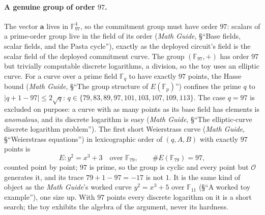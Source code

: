 \documentclass[11pt,a4paper]{article}
\theoremstyle{definition}
\newcommand{\F}{\mathbb{F}}
\begin{document}
\paragraph{A genuine group of order $97$.}
The vector $\mathbf a$ lives in $\F_{97}^{4}$, so the commitment group
must have order $97$: scalars of a prime-order group live in the field
of its order (\emph{Math Guide}, \S``Base fields, scalar fields, and
the Pasta cycle''), exactly as the deployed circuit's field is the
scalar field of the deployed commitment curve. The group
$(\F_{97}, +)$ has order $97$ but trivially computable discrete
logarithms, a division, so the toy uses an elliptic curve. For a curve
over a prime field $\F_q$ to have exactly $97$ points, the Hasse bound
(\emph{Math Guide}, \S``The group structure of $E(\F_p)$'') confines the
prime $q$ to $|q + 1 - 97| \le 2\sqrt q$:
$q \in \{79, 83, 89, 97, 101, 103, 107, 109, 113\}$. The case $q = 97$
is excluded on purpose: a curve with as many points as its base field
has elements is \emph{anomalous}, and its discrete logarithm is easy
(\emph{Math Guide}, \S``The elliptic-curve discrete logarithm
problem''). The first short Weierstrass curve (\emph{Math Guide},
\S``Weierstrass equations'') in lexicographic order of $(q, A, B)$ with
exactly $97$ points is
\[
E \colon y^{2} = x^{3} + 3 \quad\text{over } \F_{79},
\qquad \#E(\F_{79}) = 97 ,
\]
counted point by point; $97$ is prime, so the group is cyclic and every
point but $\mathcal O$ generates it, and its trace $79 + 1 - 97 = -17$
is not $1$. It is the same kind of object as the \emph{Math Guide}'s
worked curve $y^2 = x^3 + 5$ over $\F_{11}$ (\S``A worked toy
example''), one size up. With $97$ points every discrete logarithm on
it is a short search; the toy exhibits the algebra of the argument,
never its hardness.
\end{document}
